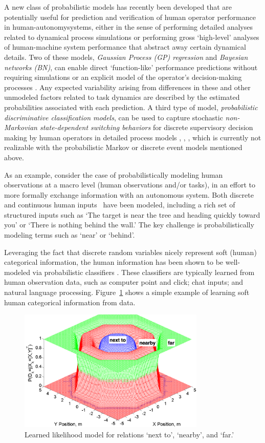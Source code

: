 A new class of probabilistic models has recently been developed that are potentially useful for prediction and verification of human operator performance in human-autonomysystems, either in the sense of performing detailed analyses related to dynamical process simulations or performing gross `high-level' analyses of human-machine system performance that abstract away certain dynamical details. Two of these models, \emph{Gaussian Process (GP) regression} and \emph{Bayesian networks (BN)}, can enable direct `function-like' performance  predictions without requiring simulations or an explicit model of the operator's decision-making processes \cite{Ergo}. Any expected variability arising from differences in these and other unmodeled factors related to task dynamics are described by the estimated probabilities associated with each prediction. A third type of model,  \emph{probabilistic discriminative classification models}, can be used to capture stochastic \emph{non-Markovian state-dependent switching behaviors} for discrete supervisory decision making by human operators in detailed process models \cite{Bourgault2007}, \cite{Ahmed2008}, \cite{Ahmed2011a}, which is currently not realizable with the probabilistic Markov or discrete event models mentioned above. 

As an example, consider the case of probabilistically modeling human observations at a macro level (human observations and/or tasks), in an effort to more formally exchange information with an autonomous system. Both discrete~\cite{Ahmed2012a} and continuous human inputs~\cite{Bourgault2008} have been modeled, including a rich set of structured inputs such as  `The target is near the tree and heading quickly toward you' or `There is nothing behind the wall.'  The key challenge is probabilistically modeling terms such as `near' or `behind'. 

Leveraging the fact that discrete random variables nicely represent soft (human) categorical information, the human information has been shown to be well-modeled via probabilistic classifiers  \cite{Ahmed-TRO-2012, Ahmed-ICRA-2010, Ahmed-ACC-2011a,Ahmed10SigPro}.  These classifiers are typically learned from human observation data, such as computer point and click; chat inputs; and natural language processing. Figure~\ref{fig:likelihood} shows a simple example of learning soft human categorical information from data.

\begin{figure}[h] 
\centering
   \includegraphics[width=3.5in]{mms.pdf} 
   \caption{Learned likelihood model for relations `next to', `nearby', and `far.' }
   \label{fig:likelihood}
\end{figure}

